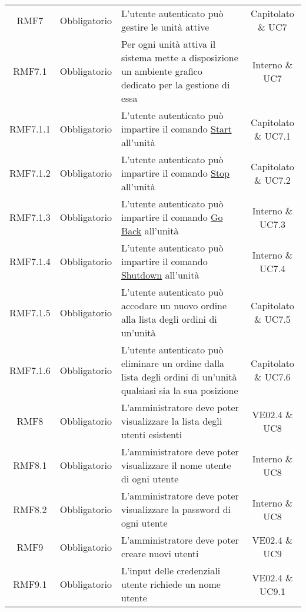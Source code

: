 \begin{longtable}[h!] { c c m{8cm} c}
		RMF7 & Obbligatorio & L'utente autenticato può gestire le unità attive & Capitolato \& UC7 \\

		RMF7.1 & Obbligatorio & Per ogni unità attiva il sistema mette a disposizione un ambiente grafico dedicato per la gestione di essa & Interno \& UC7 \\

		RMF7.1.1 & Obbligatorio & L'utente autenticato può impartire il comando \underline{Start} all'unità & Capitolato \& UC7.1 \\

		RMF7.1.2 & Obbligatorio & L'utente autenticato può impartire il comando \underline{Stop} all'unità & Capitolato \& UC7.2 \\

		RMF7.1.3 & Obbligatorio & L'utente autenticato può impartire il comando \underline{Go Back} all'unità & Interno \& UC7.3 \\

		RMF7.1.4 & Obbligatorio & L'utente autenticato può impartire il comando \underline{Shutdown} all'unità & Interno \& UC7.4 \\

		RMF7.1.5 & Obbligatorio & L'utente autenticato può accodare un nuovo ordine alla lista degli ordini di un'unità & Capitolato \& UC7.5 \\

		RMF7.1.6 & Obbligatorio & L'utente autenticato può eliminare un ordine dalla lista degli ordini di un'unità qualsiasi sia la sua posizione & Capitolato \& UC7.6 \\

		RMF8 & Obbligatorio & L'amministratore deve poter visualizzare la lista degli utenti esistenti & VE02.4 \& UC8 \\

		RMF8.1 & Obbligatorio & L'amministratore deve poter visualizzare il nome utente di ogni utente & Interno \& UC8 \\

		RMF8.2 & Obbligatorio & L'amministratore deve poter visualizzare la password di ogni utente & Interno \& UC8 \\

		RMF9 & Obbligatorio & L'amministratore deve poter creare nuovi utenti & VE02.4 \& UC9 \\

		RMF9.1 & Obbligatorio & L'input delle credenziali utente richiede un nome utente & VE02.4 \& UC9.1 \\


\end{longtable}
